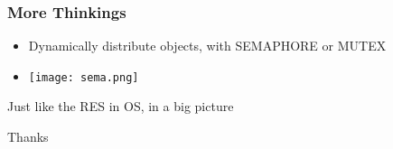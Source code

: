 \documentclass{beamer}
\begin{document}
\begin{frame}
\frametitle{More Thinkings}
\begin{itemize}
    \item Dynamically distribute objects, with SEMAPHORE or MUTEX
    \item \texttt{[image: sema.png]}
\end{itemize}

Just like the RES in OS, in a big picture

\end{frame}

\begin{frame}
\begin{center}
\Large Thanks
\end{center}
\end{frame}
\end{document}
